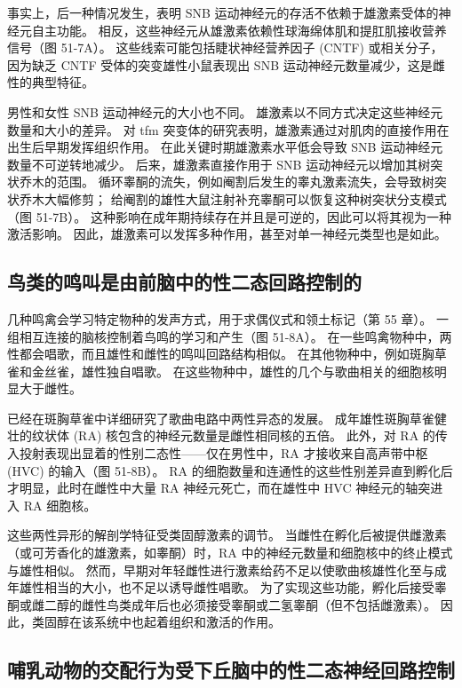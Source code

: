 事实上，后一种情况发生，表明 SNB 运动神经元的存活不依赖于雄激素受体的神经元自主功能。 相反，这些神经元从雄激素依赖性球海绵体肌和提肛肌接收营养信号（图 51-7A）。 这些线索可能包括睫状神经营养因子 (CNTF) 或相关分子，因为缺乏 CNTF 受体的突变雄性小鼠表现出 SNB 运动神经元数量减少，这是雌性的典型特征。

男性和女性 SNB 运动神经元的大小也不同。 雄激素以不同方式决定这些神经元数量和大小的差异。 对 tfm 突变体的研究表明，雄激素通过对肌肉的直接作用在出生后早期发挥组织作用。 在此关键时期雄激素水平低会导致 SNB 运动神经元数量不可逆转地减少。 后来，雄激素直接作用于 SNB 运动神经元以增加其树突状乔木的范围。 循环睾酮的流失，例如阉割后发生的睾丸激素流失，会导致树突状乔木大幅修剪； 给阉割的雄性大鼠注射补充睾酮可以恢复这种树突状分支模式（图 51-7B）。 这种影响在成年期持续存在并且是可逆的，因此可以将其视为一种激活影响。 因此，雄激素可以发挥多种作用，甚至对单一神经元类型也是如此。

\subsection{鸟类的鸣叫是由前脑中的性二态回路控制的}
几种鸣禽会学习特定物种的发声方式，用于求偶仪式和领土标记（第 55 章）。 一组相互连接的脑核控制着鸟鸣的学习和产生（图 51-8A）。 在一些鸣禽物种中，两性都会唱歌，而且雄性和雌性的鸣叫回路结构相似。 在其他物种中，例如斑胸草雀和金丝雀，雄性独自唱歌。 在这些物种中，雄性的几个与歌曲相关的细胞核明显大于雌性。

已经在斑胸草雀中详细研究了歌曲电路中两性异态的发展。 成年雄性斑胸草雀健壮的纹状体 (RA) 核包含的神经元数量是雌性相同核的五倍。 此外，对 RA 的传入投射表现出显着的性别二态性——仅在男性中，RA 才接收来自高声带中枢 (HVC) 的输入（图 51-8B）。 RA 的细胞数量和连通性的这些性别差异直到孵化后才明显，此时在雌性中大量 RA 神经元死亡，而在雄性中 HVC 神经元的轴突进入 RA 细胞核。

这些两性异形的解剖学特征受类固醇激素的调节。 当雌性在孵化后被提供雌激素（或可芳香化的雄激素，如睾酮）时，RA 中的神经元数量和细胞核中的终止模式与雄性相似。 然而，早期对年轻雌性进行激素给药不足以使歌曲核雄性化至与成年雄性相当的大小，也不足以诱导雌性唱歌。 为了实现这些功能，孵化后接受睾酮或雌二醇的雌性鸟类成年后也必须接受睾酮或二氢睾酮（但不包括雌激素）。 因此，类固醇在该系统中也起着组织和激活的作用。

\subsection{哺乳动物的交配行为受下丘脑中的性二态神经回路控制}

